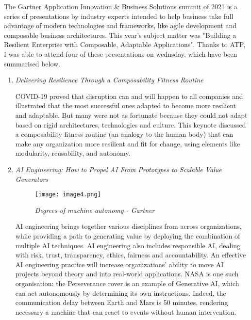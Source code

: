 The Gartner Application Innovation \& Business Solutions summit of 2021 is a series of presentations by industry experts intended to help business take full advantage of modern technologies and frameworks, like agile development and composable business architectures. This year's subject matter was "Building a Resilient Enterprise with Composable, Adaptable Applications". Thanks to ATP, I was able to attend four of these presentations on wednsday, which have been summarised below.

\begin{enumerate}
    \item \color{dgreen} \textit{Delivering Resilience Through a Composability Fitness Routine}
    
    \color{black}COVID-19 proved that disruption can and will happen to all companies and illustrated that the most successful ones adapted to become more resilient and adaptable. But many were not as fortunate because they could not adapt based on rigid architectures, technologies and culture. This keynote discussed a composability fitness routine (an analogy to the human body) that can make any organization more resilient and fit for change, using elements like modularity, reusability, and autonomy.

    \item \color{dgreen} \textit{AI Engineering: How to Propel AI From Prototypes to Scalable Value Generators}
    
    \begin{figure}[H]
        \centering
            \texttt{[image: image4.png]}
            \caption*{\textit{Degrees of machine autonomy - Gartner}}
    \end{figure}

    \color{black} AI engineering brings together various disciplines from across organizations, while providing a path to generating value by deploying the combination of multiple AI techniques. AI engineering also includes responsible AI, dealing with risk, trust, transparency, ethics, fairness and accountability. An effective AI engineering practice will increase organizations’ ability to move AI projects beyond theory and into real-world applications. NASA is one such organisation: the Perseverance rover is an example of Generative AI, which can act  autonomously by determining its own instructions. Indeed, the communication delay between Earth and Mars is 50 minutes, rendering necessary a machine that can react to events without human intervention.


\end{enumerate}
